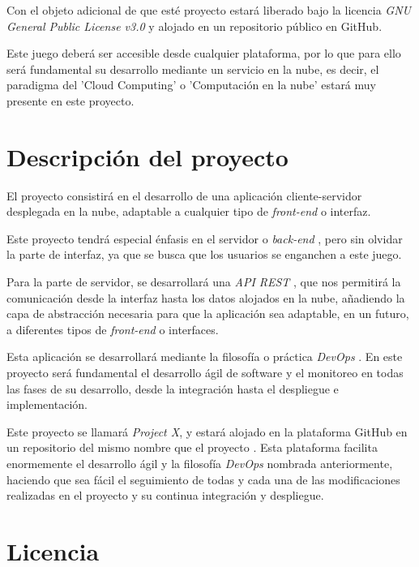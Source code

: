 Con el objeto adicional de que esté proyecto estará liberado bajo la licencia \textit{GNU General Public License v3.0} \cite{licenciaproyecto} y alojado en un repositorio público en GitHub.

Este juego deberá ser accesible desde cualquier plataforma, por lo que para ello será fundamental su desarrollo mediante un servicio en la nube, es decir, el paradigma del 'Cloud Computing' o 'Computación en la nube' \cite{nube1} estará muy presente en este proyecto.

\section{Descripción del proyecto}

El proyecto consistirá en el desarrollo de una aplicación cliente-servidor desplegada en la nube, adaptable a cualquier tipo de \textit{front-end} \cite{frontback} o interfaz.

Este proyecto tendrá especial énfasis en el servidor o \textit{back-end} \cite{frontback}, pero sin olvidar la parte de interfaz, ya que se busca que los usuarios se enganchen a este juego.

Para la parte de servidor, se desarrollará una \textit{API REST} \cite{api1} \cite{api2} \cite{api3}, que nos permitirá la comunicación desde la interfaz hasta los datos alojados en la nube, añadiendo la capa de abstracción necesaria para que la aplicación sea adaptable, en un futuro, a diferentes tipos de \textit{front-end} o interfaces. 

Esta aplicación se desarrollará mediante la filosofía o práctica \textit{DevOps} \cite{devops1} \cite{devops2} \cite{devops3} \cite{devops4}. En este proyecto será fundamental el desarrollo ágil de software y el monitoreo en todas las fases de su desarrollo, desde la integración hasta el despliegue e implementación.

Este proyecto se llamará \textit{Project X}, y estará alojado en la plataforma GitHub en un repositorio del mismo nombre que el proyecto \cite{proyectogithub}. Esta plataforma facilita enormemente el desarrollo ágil y la filosofía \textit{DevOps} nombrada anteriormente, haciendo que sea fácil el seguimiento de todas y cada una de las modificaciones realizadas en el proyecto y su continua integración y despliegue.

\section{Licencia}

